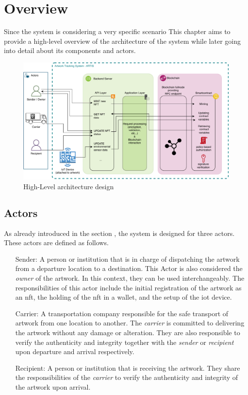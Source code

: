 \section{Overview}
Since the system is considering a very specific scenario This chapter aims to provide a high-level overview of the architecture of the system while later going into detail about its components and actors.

\begin{figure}[ht]
    \centering
    \includegraphics[height=0.5\textheight, keepaspectratio]{diagrams/Architecture.drawio.pdf}
    \caption{High-Level architecture design}
    \label{fig:architecture}
\end{figure}

\subsection{Actors}
As already introduced in the section , the system is designed for three actors. These actors are defined as follows.

\begin{itemize}[align=left, font=\itshape]
    \item[Sender:] A person or institution that is in charge of dispatching the artwork from a departure location to a destination. This Actor is also considered the \textit{owner} of the artwork. In this context, they can be used interchangeably. The responsibilities of this actor include the initial registration of the artwork as an \gls{nft}, the holding of the \gls{nft} in a \gls{wallet}, and the setup of the \gls{iot} device.

    \item[Carrier:] A transportation company responsible for the safe transport of artwork from one location to another. The \textit{carrier} is committed to delivering the artwork without any damage or alteration. They are also responsible to verify the authenticity and integrity together with the \textit{sender} or \textit{recipient} upon departure and arrival respectively.

    \item[Recipient:] A person or institution that is receiving the artwork. They share the responsibilities of the \textit{carrier} to verify the authenticity and integrity of the artwork upon arrival. 
\end{itemize}



